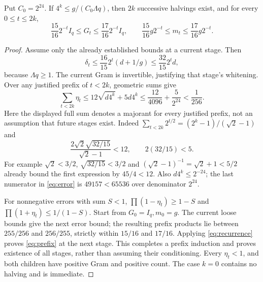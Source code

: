\begin{lemma}\label{lem:prefix}
Put $C_0=2^{24}$. If $4^k\leq g/(C_0\Lambda q)$, then $2k$ successive
halvings exist, and for every $0\leq t\leq2k$,
\begin{equation}\label{eq:prefix}
 \frac{15}{16}2^{-t}I_q\leq G_t\leq\frac{17}{16}2^{-t}I_q,
 \qquad\frac{15}{16}g2^{-t}\leq m_t\leq\frac{17}{16}g2^{-t}.
\end{equation}
\end{lemma}
\begin{proof}
Assume only the already established bounds at a current stage. Then
\[
 \delta_t\leq\frac{16}{15}2^t(d+1/g)
       \leq\frac{32}{15}2^t d,
\]
because $\Lambda q\geq1$. The current Gram is invertible, justifying that
stage's whitening. Over any justified prefix of $t<2k$, geometric sums give
\begin{equation}\label{eq:error}
 \sum_{t<2k}\eta_t\leq12\sqrt{d4^k}+5d4^k
 \leq\frac{12}{4096}+\frac5{2^{24}}<\frac1{256}.
\end{equation}
Here the displayed full sum denotes a majorant for every justified prefix,
not an assumption that future stages exist. Indeed
$\sum_{t<2k}2^{t/2}=(2^k-1)/(\sqrt2-1)$ and
\[
 \frac{2\sqrt2\sqrt{32/15}}{\sqrt2-1}<12,
 \qquad 2(32/15)<5.
\]
For example $\sqrt2<3/2$, $\sqrt{32/15}<3/2$ and
$(\sqrt2-1)^{-1}=\sqrt2+1<5/2$ already bound the first expression by
$45/4<12$. Also $d4^k\leq2^{-24}$; the last numerator in
\eqref{eq:error} is $49157<65536$ over denominator $2^{24}$.

For nonnegative errors with sum $S<1$,
$\prod(1-\eta_t)\geq1-S$ and
$\prod(1+\eta_t)\leq1/(1-S)$.
Start from $G_0=I_q,m_0=g$. The current loose bounds give the next error
bound; the resulting prefix products lie between $255/256$ and $256/255$,
strictly within $15/16$ and $17/16$. Applying \eqref{eq:recurrence} proves
\eqref{eq:prefix} at the next stage. This completes a prefix induction and
proves existence of all stages, rather than assuming their conditioning.
Every $\eta_t<1$, and both children have positive Gram and positive count.
The case $k=0$ contains no halving and is immediate.
\end{proof}

